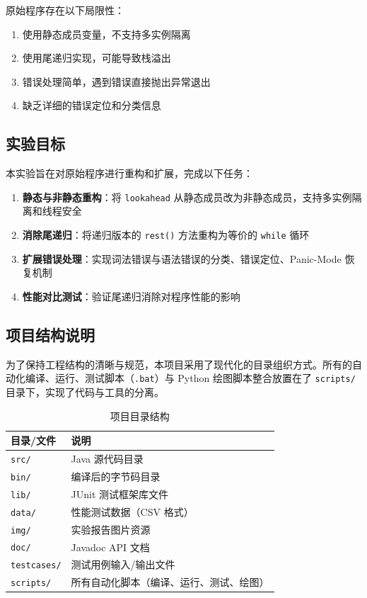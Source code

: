 \documentclass[a4paper]{article}
\begin{document}
原始程序存在以下局限性：
\begin{enumerate}
    \item 使用静态成员变量，不支持多实例隔离
    \item 使用尾递归实现，可能导致栈溢出
    \item 错误处理简单，遇到错误直接抛出异常退出
    \item 缺乏详细的错误定位和分类信息
\end{enumerate}

\subsection{实验目标}

本实验旨在对原始程序进行重构和扩展，完成以下任务：
\begin{enumerate}
    \item \textbf{静态与非静态重构}：将 \texttt{lookahead} 从静态成员改为非静态成员，支持多实例隔离和线程安全
    \item \textbf{消除尾递归}：将递归版本的 \texttt{rest()} 方法重构为等价的 \texttt{while} 循环
    \item \textbf{扩展错误处理}：实现词法错误与语法错误的分类、错误定位、Panic-Mode 恢复机制
    \item \textbf{性能对比测试}：验证尾递归消除对程序性能的影响
\end{enumerate}

\subsection{项目结构说明}

为了保持工程结构的清晰与规范，本项目采用了现代化的目录组织方式。所有的自动化编译、运行、测试脚本（\texttt{.bat}）与 Python 绘图脚本整合放置在了 \texttt{scripts/} 目录下，实现了代码与工具的分离。

\begin{table}[H]
\centering
\begin{tabular}{ll}
\toprule
\textbf{目录/文件} & \textbf{说明} \\
\midrule
\texttt{src/} & Java 源代码目录 \\
\texttt{bin/} & 编译后的字节码目录 \\
\texttt{lib/} & JUnit 测试框架库文件 \\
\texttt{data/} & 性能测试数据（CSV 格式） \\
\texttt{img/} & 实验报告图片资源 \\
\texttt{doc/} & Javadoc API 文档 \\
\texttt{testcases/} & 测试用例输入/输出文件 \\
\texttt{scripts/} & 所有自动化脚本（编译、运行、测试、绘图） \\
\bottomrule
\end{tabular}
\caption{项目目录结构}
\end{table}
\end{document}
